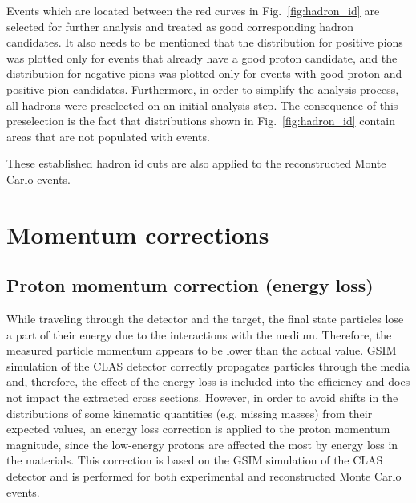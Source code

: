 Events which are located between the red curves in Fig.~\ref{fig:hadron_id} are selected for further analysis and treated as good corresponding hadron candidates. It also needs to be mentioned that the distribution for positive pions was plotted only for events that already have a good proton candidate, and the distribution for negative pions was plotted only for events with good proton and positive pion candidates. Furthermore, in order to simplify the analysis process, all hadrons were preselected on an initial analysis step. The consequence of this preselection is the fact that distributions shown in Fig.~\ref{fig:hadron_id} contain areas that are not populated with events.

These established hadron id cuts are also applied to the reconstructed Monte Carlo events. 


\section{Momentum corrections}
\label{Sect:momcorr}

\subsection{Proton momentum correction (energy loss)}
\label{Sect:pr_en_loss}


While traveling through the detector and the target, the final state particles lose a part of their energy due to the interactions with the medium. Therefore, the measured particle momentum appears to be lower than the actual value. GSIM simulation of the CLAS detector correctly propagates particles  through the media and, therefore, the effect of the energy loss is included into the efficiency and does not impact the extracted cross sections. However, in order to avoid shifts in the distributions of some kinematic quantities (e.g. missing masses) from their expected values, an energy loss correction is applied to the proton momentum magnitude, since the low-energy protons are affected the most by energy loss in the materials. This correction is based on the GSIM simulation of the CLAS detector and is performed for both experimental and reconstructed Monte Carlo events.

